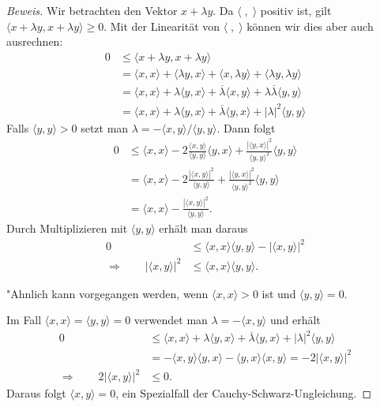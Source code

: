 \begin{proof}[Beweis]
Wir betrachten den Vektor $x+\lambda y$.
Da $\langle\;,\;\rangle$ positiv ist, gilt 
$\langle x+\lambda y,x+\lambda y\rangle \ge 0$.
Mit der Linearität von $\langle\;,\;\rangle$ können wir dies
aber auch ausrechnen:
\begin{align*}
0&\le
\langle x+\lambda y,x+\lambda y\rangle
\\
&=
\langle x,x\rangle
+
\langle \lambda y,x\rangle
+
\langle x,\lambda y\rangle
+
\langle \lambda y,\lambda y\rangle
\\
&=
\langle x,x\rangle
+
\lambda\langle y,x\rangle
+
\overline{\lambda}\langle x,y\rangle
+
\lambda\overline{\lambda}\langle y,y\rangle
\\
&=
\langle x,x\rangle
+
\lambda\langle y,x\rangle
+
\overline{\lambda}\langle y,x\rangle
+
|\lambda|^2\langle y,y\rangle
\end{align*}
Falls $\langle y,y\rangle >0$
setzt man $\lambda = - \langle x,y\rangle/\langle y,y\rangle$.
Dann folgt
\begin{align*}
0
&\le
\langle x,x\rangle
-
2\frac{\langle x,y\rangle}{\langle y,y\rangle}\langle y,x\rangle
+
\frac{|\langle y,x\rangle|^2}{\langle y,y\rangle^2}\langle y,y\rangle
\\
&=
\langle x,x\rangle
-2
\frac{|\langle x,y\rangle|^2}{\langle y,y\rangle}
+
\frac{|\langle y,x\rangle|^2}{\langle y,y\rangle^2}\langle y,y\rangle
\\
&=
\langle x,x\rangle
-
\frac{|\langle x,y\rangle|^2}{\langle y,y\rangle}.
\end{align*}
Durch Multiplizieren mit $\langle y,y\rangle$ erhält man daraus
\begin{align*}
0&\le
\langle x,x\rangle\langle y,y\rangle
-
|\langle x,y\rangle|^2
\\
\Rightarrow\qquad
|\langle x,y\rangle|^2
&\le
\langle x,x\rangle\langle y,y\rangle.
\end{align*}

"Ahnlich kann vorgegangen werden, wenn $\langle x,x\rangle > 0$ ist und
$\langle y,y\rangle =0$.

Im Fall $\langle x,x\rangle=\langle y,y\rangle=0$ verwendet man 
$\lambda = -\langle x,y\rangle$ und erhält
\begin{align*}
0
&\le
\langle x,x\rangle
+
\lambda\langle y,x\rangle
+
\overline{\lambda}\langle y,x\rangle
+
|\lambda|^2\langle y,y\rangle
\\
&=
-\langle x,y\rangle\langle y,x\rangle
-\langle y,x\rangle\langle x,y\rangle
=
-2|\langle x,y\rangle|^2
\\
\Rightarrow\qquad
2|\langle x,y\rangle|^2
&\le 0.
\end{align*}
Daraus folgt $\langle x,y\rangle = 0$, ein Spezialfall der
Cauchy-Schwarz-Ungleichung.
\end{proof}

